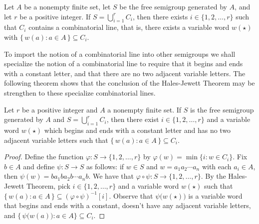 \begin{hj}
  Let $A$ be a nonempty finite set, let $S$ be the free semigroup generated by $A$, and let $r$ be a positive integer.
  If $S = \bigcup_{i=1}^r C_i$, then there exists $i \in \{1, 2, \ldots, r\}$ such that $C_i$ contains a combinatorial line, that is, there exists a variable word $w(\star)$ with $\bigl\{\, w(a) : a \in A \,\bigr\} \subseteq C_i$.
\end{hj}

To import the notion of a combinatorial line into other semigroups we shall specialize the notion of a combinatorial line to require that it begins and ends with a constant letter, and that there are no two adjacent variable letters.
The following theorem shows that the conclusion of the Hales-Jewett Theorem may be strengthen to these specialize combinatorial lines.  

\begin{thm}
  \label{thm:special-hj}
  Let $r$ be a positive integer and $A$ a nonempty finite set.
  If $S$ is the free semigroup generated by $A$ and $S = \bigcup_{i=1}^r C_i$, then there exist $i \in \{1, 2, \ldots, r\}$ and a variable word $w(\star)$ which begins and ends with a constant letter and has no two adjacent variable letters such that $\bigl\{\, w(a) : a \in A \,\bigr\} \subseteq C_i$.
\end{thm}
\begin{proof}
  Define the function $\varphi \colon S \to \{1, 2, \ldots, r\}$ by $\varphi(w) = \min\{i : w \in C_i\}$. 
  Fix $b \in A$ and define $\psi \colon S \to S$ as follows: if $w \in S$ and $w = a_1a_2 \cdots a_n$ with each $a_i \in A$, then $\psi(w) = ba_1ba_2b\cdots a_nb$.
  We have that $\varphi \circ \psi \colon S \to \{1, 2, \ldots, r\}$.
  By the Hales-Jewett Theorem, pick $i \in \{1, 2, \ldots, r\}$ and a variable word $w(\star)$ such that $\{\, w(a) : a \in A \,\} \subseteq (\varphi \circ \psi)^{-1}[i]$.
  Observe that $\psi\bigl(w(\star)\bigr)$ is a variable word that begins and ends with a constant, doesn't have any adjacent variable letters, and $\{\, \psi\bigl(w(a)\bigr) : a \in A \} \subseteq C_i$.
\end{proof}

